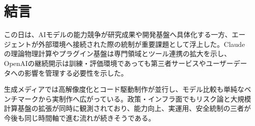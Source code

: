\section*{結言}
この日は、AIモデルの能力競争が研究成果や開発基盤へ具体化する一方、エージェントが外部環境へ接続された際の統制が重要課題として浮上した。Claudeの理論物理計算やプラグイン基盤は専門領域とツール連携の拡大を示し、OpenAIの継続開示は訓練・評価環境であっても第三者サービスやユーザーデータへの影響を管理する必要性を示した。

生成メディアでは高解像度化とコード駆動制作が並行し、モデル比較も単純なベンチマークから実制作へ広がっている。政策・インフラ面でもリスク論と大規模計算基盤の拡張が同時に観測されており、能力向上、実運用、安全統制の三者が今後も同じ時間軸で進む流れが続きそうである。
